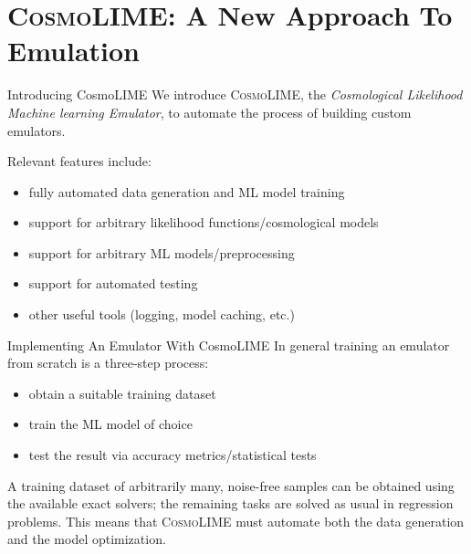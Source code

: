 \documentclass[aspectratio=43,xcolor=svgnames]{beamer} %
\begin{document}
\section{\textsc{CosmoLIME}: A New Approach To Emulation}
\begin{frame}{Introducing CosmoLIME}
We introduce \textsc{CosmoLIME}, the \emph{Cosmological Likelihood Machine learning Emulator}, to automate the process of building custom emulators.

\vspace{1em}
Relevant features include:
\pause
\begin{itemize}[<+->]
    \item fully automated data generation and ML model training
    \item support for arbitrary likelihood functions/cosmological models
    \item support for arbitrary ML models/preprocessing
    \item support for automated testing
    \item other useful tools (logging, model caching, etc.)
\end{itemize}
\end{frame}

\begin{frame}{Implementing An Emulator With CosmoLIME}
In general training an emulator from scratch is a three-step process:
\pause
\begin{itemize}[<+->]
    \item obtain a suitable training dataset
    \item train the ML model of choice
    \item test the result via accuracy metrics/statistical tests
\end{itemize}
\pause
\vspace{1em}
A training dataset of arbitrarily many, noise-free samples can be obtained using the available exact solvers; the remaining tasks are solved as usual in regression problems. This means that \textsc{CosmoLIME} must automate both the data generation and the model optimization.
\end{frame}
\end{document}
